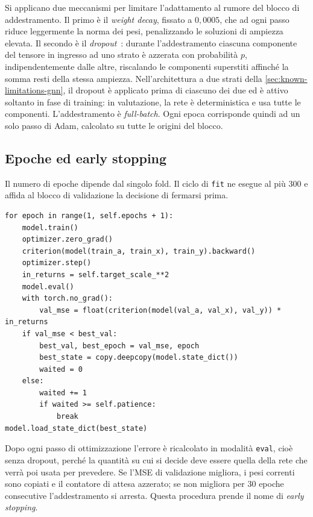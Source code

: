 Si applicano due meccanismi per limitare l'adattamento al rumore del blocco di addestramento. Il primo è il \emph{weight decay}, fissato a $0{,}0005$, che ad ogni passo riduce leggermente la norma dei pesi, penalizzando le soluzioni di ampiezza elevata. Il secondo è il \emph{dropout}~\cite{srivastava2014dropout}: durante l'addestramento ciascuna componente del tensore in ingresso ad uno strato è azzerata con probabilità $p$, indipendentemente dalle altre, riscalando le componenti superstiti affinché la somma resti della stessa ampiezza. Nell'architettura a due strati della \cref{sec:known-limitations-gnn}, il dropout è applicato prima di ciascuno dei due ed è attivo soltanto in fase di training: in valutazione, la rete è deterministica e usa tutte le componenti. L'addestramento è \emph{full-batch}. Ogni epoca corrisponde quindi ad un solo passo di Adam, calcolato su tutte le origini del blocco.

\subsection{Epoche ed early stopping}

Il numero di epoche dipende dal singolo fold. Il ciclo di \texttt{fit} ne esegue al più $300$ e affida al blocco di validazione la decisione di fermarsi prima.

\begin{listing}[H]
\begin{verbatim}
for epoch in range(1, self.epochs + 1):
    model.train()
    optimizer.zero_grad()
    criterion(model(train_a, train_x), train_y).backward()
    optimizer.step()
    in_returns = self.target_scale_**2
    model.eval()
    with torch.no_grad():
        val_mse = float(criterion(model(val_a, val_x), val_y)) * in_returns
    if val_mse < best_val:
        best_val, best_epoch = val_mse, epoch
        best_state = copy.deepcopy(model.state_dict())
        waited = 0
    else:
        waited += 1
        if waited >= self.patience:
            break
model.load_state_dict(best_state)
\end{verbatim}
\caption{\texttt{fit}}
\label{lst:gcn-fit}
\end{listing}

Dopo ogni passo di ottimizzazione l'errore è ricalcolato in modalità \texttt{eval}, cioè senza dropout, perché la quantità su cui si decide deve essere quella della rete che verrà poi usata per prevedere. Se l'MSE di validazione migliora, i pesi correnti sono copiati e il contatore di attesa azzerato; se non migliora per $30$ epoche consecutive l'addestramento si arresta. Questa procedura prende il nome di \emph{early stopping}.

